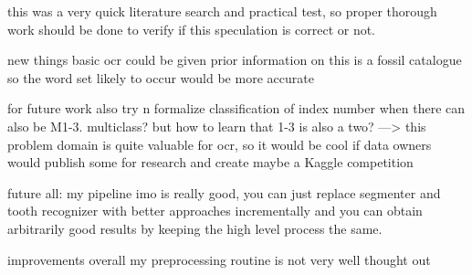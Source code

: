 \documentclass{article}
\begin{document}
this was a very quick literature search and practical test, so proper thorough work should be done to verify if this speculation 
is correct or not.

new things
basic ocr could be given prior information on this is a fossil catalogue so the word set likely to occur would be more accurate

for future work also try n formalize classification of index number
when there can also be M1-3. multiclass? but how to learn that 1-3 is also a two?
---> this problem domain is quite valuable for ocr, so it would be cool if 
data owners would publish some for research and create maybe a Kaggle competition

future all: my pipeline imo is really good, you can just replace segmenter and tooth recognizer 
with better approaches incrementally and you can obtain arbitrarily good results by 
keeping the high level process the same.

improvements overall
my preprocessing routine is not very well thought out

\printbibliography
\end{document}
